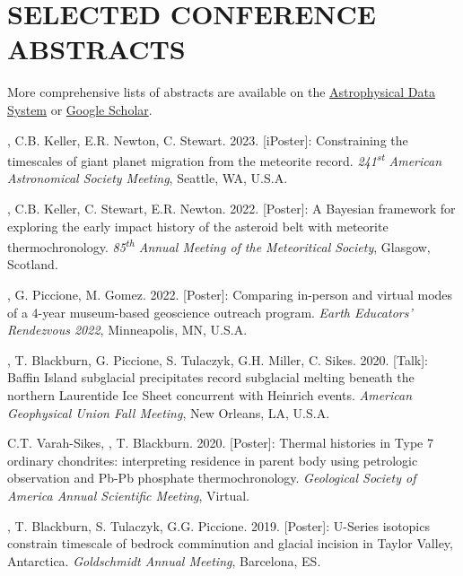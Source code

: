 \section*{SELECTED CONFERENCE ABSTRACTS}


More comprehensive lists of abstracts are available on the \href{https://ui.adsabs.harvard.edu/public-libraries/-tel6KyoTUeLAGPFsPO0dQ}{Astrophysical Data System} or \href{https://scholar.google.com/citations?user=KHLOvgcAAAAJ&hl=en}{Google Scholar}. 


\begin{etaremune} [itemsep=4pt, leftmargin=3ex]
  \item \ghedwards, C.B. Keller,  E.R. Newton, C. Stewart. 2023. [iPoster]: Constraining the timescales of giant planet migration from the meteorite record. \textit{241\textsuperscript{st} American Astronomical Society Meeting}, Seattle, WA, U.S.A.
  
  \item \ghedwards, C.B. Keller, C. Stewart, E.R. Newton. 2022. [Poster]: A Bayesian framework for exploring the early impact history of the asteroid belt with meteorite thermochronology. \textit{85\textsuperscript{th} Annual Meeting of the Meteoritical Society}, Glasgow, Scotland. 
 
  \item \ghedwards, G. Piccione, M. Gomez. 2022. [Poster]: Comparing in-person and virtual modes of a 4-year museum-based geoscience outreach program. \textit{Earth Educators' Rendezvous 2022}, Minneapolis, MN, U.S.A.
  
  \item \ghedwards, T. Blackburn, G. Piccione, S. Tulaczyk, G.H. Miller, C. Sikes. 2020. [Talk]: Baffin Island subglacial precipitates record subglacial melting beneath the northern Laurentide Ice Sheet concurrent with Heinrich events. \textit{American Geophysical Union Fall Meeting}, New Orleans, LA, U.S.A.
  
  \item C.T. Varah-Sikes, \ghedwards, T. Blackburn. 2020. [Poster]: Thermal histories in Type 7 ordinary chondrites: interpreting residence in parent body using petrologic observation and Pb-Pb phosphate thermochronology. \textit{Geological Society of America Annual Scientific Meeting}, Virtual.
  
  \item  \ghedwards, T. Blackburn, S. Tulaczyk, G.G. Piccione. 2019. [Poster]: U-Series isotopics constrain timescale of bedrock comminution and glacial incision in Taylor Valley, Antarctica. \textit{Goldschmidt Annual Meeting}, Barcelona, ES.
  

\end{etaremune}
